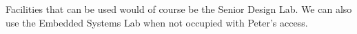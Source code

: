 Facilities that can be used would of course be the Senior Design Lab. We can also use the Embedded Systems Lab when not occupied with Peter's access. 